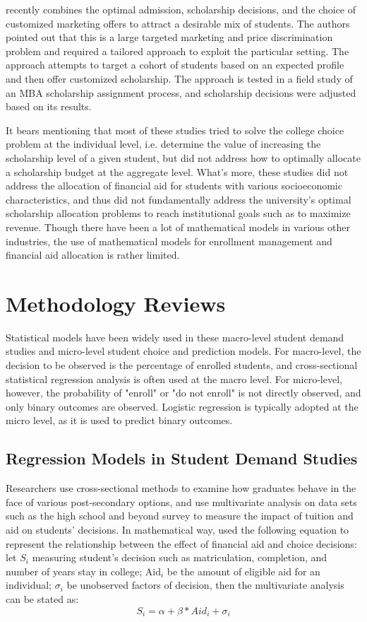 \documentclass[12pt,english]{report}
\begin{document}
\citet{Belloni2012} recently combines the optimal admission, scholarship decisions, and the choice of customized marketing offers 
to attract a desirable mix of students.  The authors pointed out that this is a large targeted  marketing and price 
discrimination problem and required a tailored approach to exploit the particular setting.  The approach attempts to target a 
cohort of students based on an expected profile and then offer customized scholarship. The approach is tested in a field study of 
an MBA scholarship assignment process, and scholarship decisions were adjusted based on its results.

It bears mentioning that most of these studies tried to solve the college choice problem at the individual level, i.e. determine the value of increasing the scholarship level of a given student, but did not address how to optimally allocate a scholarship budget at the aggregate level. What's more, these studies did not address the allocation of financial aid for students with various socioeconomic characteristics, and thus did not fundamentally address the university's optimal scholarship allocation problems to reach institutional goals such as to maximize revenue.  Though there have been a lot of mathematical models in various other industries, the use of mathematical models for enrollment management and financial aid allocation is rather limited.

\section{Methodology Reviews}
Statistical models have been widely used in these macro-level student 
demand studies and micro-level student choice and prediction models. 
For macro-level, the decision to be observed is the percentage of 
enrolled students, and cross-sectional statistical regression 
analysis is often used at the macro level. For micro-level, however, 
the probability of "enroll" or "do not enroll" is not directly 
observed, and only binary outcomes are observed. Logistic regression 
is typically adopted at the micro level, as it is used to predict 
binary outcomes.

\subsection{Regression Models in Student Demand Studies}
 Researchers use cross-sectional methods to examine how graduates behave in the face of various post-secondary options, and use multivariate analysis on data sets such as the high school and beyond survey to measure the impact of tuition and aid on students' decisions. In mathematical way,
\citet{Dynarski2002} used the following equation to represent the relationship between the effect of financial aid and choice decisions:
let $S_i$ measuring student's decision such as matriculation, completion, and number of years stay in college; Aid$_i$ be the amount of eligible aid for an individual; $\sigma_i$  be unobserved factors of decision, then the multivariate analysis can be stated as: $$S_i = \alpha + \beta * Aid_i + \sigma_i$$
\end{document}
